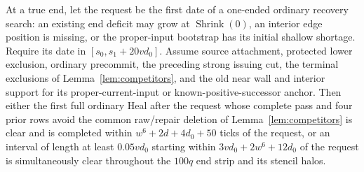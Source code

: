 \begin{lemma}\label{lem:calendar}
At a true end, let the request be the first date of a one-ended ordinary recovery search: an existing end deficit may grow at \(\operatorname{Shrink}(0)\), an interior edge position is missing, or the proper-input bootstrap has its initial shallow shortage. Require its date in \([s_0,s_1+20v d_0]\). Assume source attachment, protected lower exclusion, ordinary precommit, the preceding strong issuing cut, the terminal exclusions of Lemma~\ref{lem:competitors}, and the old near wall and interior support for its proper-current-input or known-positive-successor anchor. Then either the first full ordinary Heal after the request whose complete pass and four prior rows avoid the common raw/repair deletion of Lemma~\ref{lem:competitors} is clear and is completed within \(w^6+2d+4d_0+50\) ticks of the request, or an interval of length at least \(0.05v d_0\) starting within \(3v d_0+2w^6+12d_0\) of the request is simultaneously clear throughout the \(100q\) end strip and its stencil halos.
\end{lemma}
